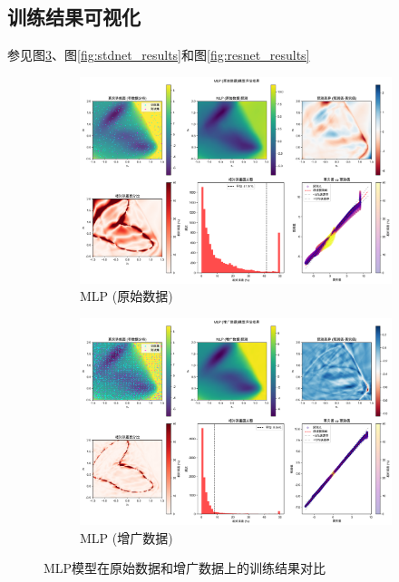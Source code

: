 \documentclass[11pt]{article}
\begin{document}
\subsection{训练结果可视化}
参见图\ref{fig:mlp_results}、图\ref{fig:stdnet_results}和图\ref{fig:resnet_results}
\begin{figure}[htbp]
    \centering
    \begin{subfigure}[b]{0.8\textwidth}
        \centering
        \includegraphics[width=\textwidth]{results_20250330_150206/figures/MLP_round1_评估结果.png}
        \caption{MLP (原始数据)}
        \label{fig:mlp_round1}
    \end{subfigure}

    \vspace{0.5cm}
    \begin{subfigure}[b]{0.8\textwidth}
        \centering
        \includegraphics[width=\textwidth]{results_20250330_150206/figures/MLP_round2_评估结果.png}
        \caption{MLP (增广数据)}
        \label{fig:mlp_round2}
    \end{subfigure}
    \caption{MLP模型在原始数据和增广数据上的训练结果对比}
    \label{fig:mlp_results}
\end{figure}
\end{document}
